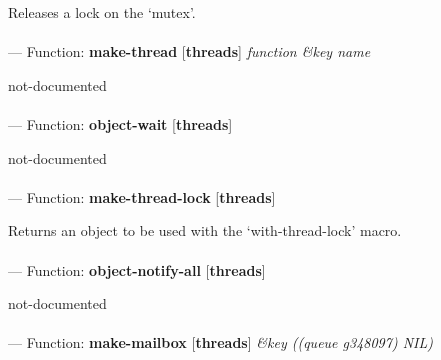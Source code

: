 \begin{adjustwidth}{5em}{5em}
Releases a lock on the `mutex'.
\end{adjustwidth}

\paragraph{}
\label{THREADS:MAKE-THREAD}
--- Function: \textbf{make-thread} [\textbf{threads}] \textit{function \&key name}

\begin{adjustwidth}{5em}{5em}
not-documented
\end{adjustwidth}

\paragraph{}
\label{THREADS:OBJECT-WAIT}
--- Function: \textbf{object-wait} [\textbf{threads}] \textit{}

\begin{adjustwidth}{5em}{5em}
not-documented
\end{adjustwidth}

\paragraph{}
\label{THREADS:MAKE-THREAD-LOCK}
--- Function: \textbf{make-thread-lock} [\textbf{threads}] \textit{}

\begin{adjustwidth}{5em}{5em}
Returns an object to be used with the `with-thread-lock' macro.
\end{adjustwidth}

\paragraph{}
\label{THREADS:OBJECT-NOTIFY-ALL}
--- Function: \textbf{object-notify-all} [\textbf{threads}] \textit{}

\begin{adjustwidth}{5em}{5em}
not-documented
\end{adjustwidth}

\paragraph{}
\label{THREADS:MAKE-MAILBOX}
--- Function: \textbf{make-mailbox} [\textbf{threads}] \textit{\&key ((queue g348097) NIL)}

